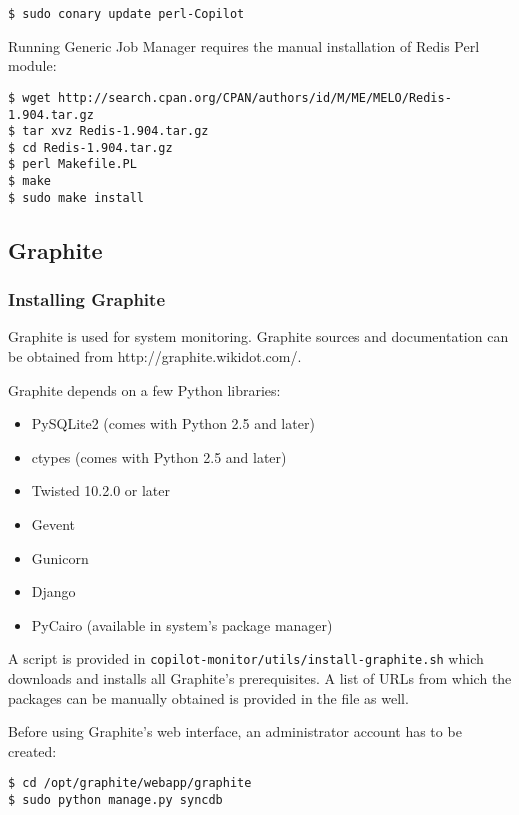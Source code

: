 \lstset{caption=Installing \copilot dependencies on CernVM}
\begin{lstlisting}
$ sudo conary update perl-Copilot
\end{lstlisting}

Running \copilot Generic Job Manager requires the manual installation of Redis Perl module:

\lstset{caption=Installing Redis Perl module}
\begin{lstlisting}
$ wget http://search.cpan.org/CPAN/authors/id/M/ME/MELO/Redis-1.904.tar.gz
$ tar xvz Redis-1.904.tar.gz
$ cd Redis-1.904.tar.gz
$ perl Makefile.PL
$ make
$ sudo make install
\end{lstlisting}

\subsection{Graphite}
\subsubsection{Installing Graphite}
Graphite is used for system monitoring. Graphite sources and documentation can be obtained from http://graphite.wikidot.com/.

Graphite depends on a few Python libraries:
\begin{itemize}
  \item PySQLite2 (comes with Python 2.5 and later)
  \item ctypes (comes with Python 2.5 and later)
  \item Twisted 10.2.0 or later
  \item Gevent
  \item Gunicorn
  \item Django
  \item PyCairo (available in system's package manager)
\end{itemize}

A script is provided in \texttt{copilot-monitor/utils/install-graphite.sh} which downloads and installs all Graphite's prerequisites.
A list of URLs from which the packages can be manually obtained is provided in the file as well.

Before using Graphite's web interface, an administrator account has to be created:
\lstset{caption=Creating admin users}
\begin{lstlisting}
$ cd /opt/graphite/webapp/graphite
$ sudo python manage.py syncdb
\end{lstlisting}

